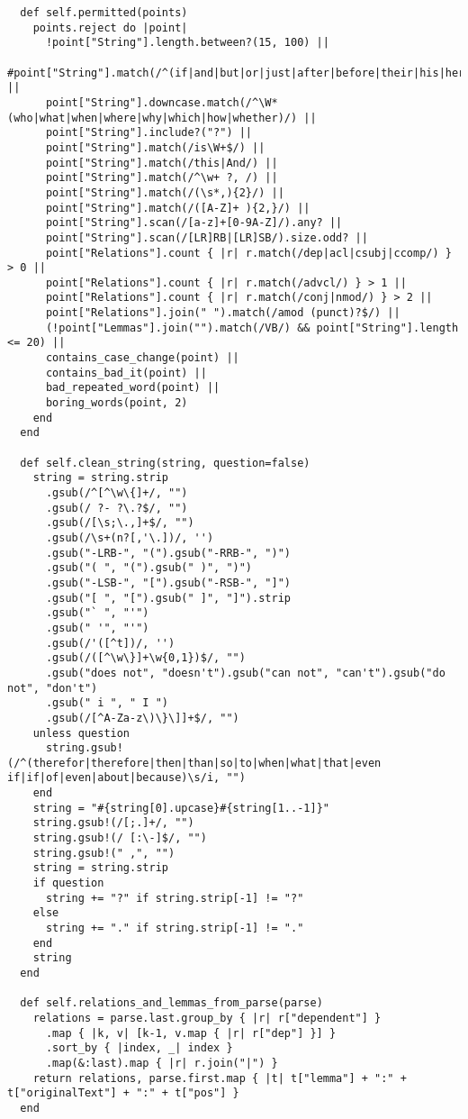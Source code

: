 \documentclass{article}
\begin{document}
\begin{verbatim}
  def self.permitted(points)
    points.reject do |point|
      !point["String"].length.between?(15, 100) ||
      #point["String"].match(/^(if|and|but|or|just|after|before|their|his|her|why)/i) ||
      point["String"].downcase.match(/^\W*(who|what|when|where|why|which|how|whether)/) ||
      point["String"].include?("?") ||
      point["String"].match(/is\W+$/) ||
      point["String"].match(/this|And/) ||
      point["String"].match(/^\w+ ?, /) ||
      point["String"].match(/(\s*,){2}/) ||
      point["String"].match(/([A-Z]+ ){2,}/) ||
      point["String"].scan(/[a-z]+[0-9A-Z]/).any? ||
      point["String"].scan(/[LR]RB|[LR]SB/).size.odd? ||
      point["Relations"].count { |r| r.match(/dep|acl|csubj|ccomp/) } > 0 ||
      point["Relations"].count { |r| r.match(/advcl/) } > 1 ||
      point["Relations"].count { |r| r.match(/conj|nmod/) } > 2 ||
      point["Relations"].join(" ").match(/amod (punct)?$/) ||
      (!point["Lemmas"].join("").match(/VB/) && point["String"].length <= 20) ||
      contains_case_change(point) ||
      contains_bad_it(point) ||
      bad_repeated_word(point) ||
      boring_words(point, 2)
    end
  end

  def self.clean_string(string, question=false)
    string = string.strip
      .gsub(/^[^\w\{]+/, "")
      .gsub(/ ?- ?\.?$/, "")
      .gsub(/[\s;\.,]+$/, "")
      .gsub(/\s+(n?[,'\.])/, '')
      .gsub("-LRB-", "(").gsub("-RRB-", ")")
      .gsub("( ", "(").gsub(" )", ")")
      .gsub("-LSB-", "[").gsub("-RSB-", "]")
      .gsub("[ ", "[").gsub(" ]", "]").strip
      .gsub("` ", "'")
      .gsub(" '", "'")
      .gsub(/'([^t])/, '')
      .gsub(/([^\w\}]+\w{0,1})$/, "")
      .gsub("does not", "doesn't").gsub("can not", "can't").gsub("do not", "don't")
      .gsub(" i ", " I ")
      .gsub(/[^A-Za-z\)\}\]]+$/, "")
    unless question
      string.gsub!(/^(therefor|therefore|then|than|so|to|when|what|that|even if|if|of|even|about|because)\s/i, "")
    end
    string = "#{string[0].upcase}#{string[1..-1]}"
    string.gsub!(/[;.]+/, "")
    string.gsub!(/ [:\-]$/, "")
    string.gsub!(" ,", "")
    string = string.strip
    if question
      string += "?" if string.strip[-1] != "?"
    else
      string += "." if string.strip[-1] != "."
    end
    string
  end

  def self.relations_and_lemmas_from_parse(parse)
    relations = parse.last.group_by { |r| r["dependent"] }
      .map { |k, v| [k-1, v.map { |r| r["dep"] }] }
      .sort_by { |index, _| index }
      .map(&:last).map { |r| r.join("|") }
    return relations, parse.first.map { |t| t["lemma"] + ":" + t["originalText"] + ":" + t["pos"] }
  end


\end{verbatim}
\end{document}
